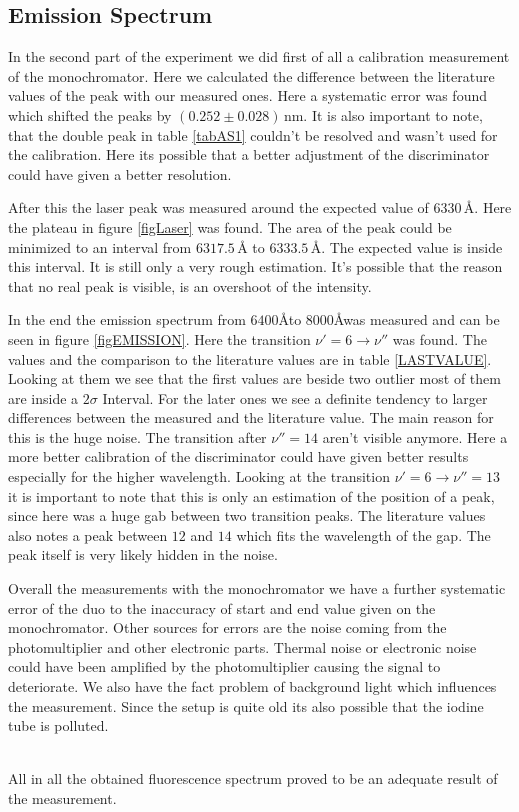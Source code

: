 \subsection{Emission Spectrum}
In the second part of the experiment we did first of all a calibration measurement of the monochromator. Here we calculated the difference between the literature values of the peak with our measured ones. Here a systematic error was found which shifted the peaks by $(0.252\pm0.028)\,$nm. It is also important to note, that the double peak in table \ref{tabAS1} couldn't be resolved and wasn't used for the calibration. Here its possible that a better adjustment of the discriminator could have given a better resolution.\par
After this the laser peak was measured around the expected value of $6330\,\text{\AA}$. Here the plateau in figure \ref{figLaser} was found. The area of the peak could be minimized to an interval from $6317.5\,\text{\AA}$ to $6333.5\,\text{\AA}$. The expected value is inside this interval. It is still only a very rough estimation. It's possible that the reason that no real peak is visible, is an overshoot of the intensity.\par
In the end the emission spectrum from $6400$\AA to $8000$\AA was measured and can be seen in figure \ref{figEMISSION}. Here the transition $\nu'=6\rightarrow \nu''$ was found. The values and the comparison to the literature values are in table \ref{LASTVALUE}. Looking at them we see that the first values are beside two outlier most of them are inside a $2\sigma$ Interval. For the later ones we see a definite tendency to larger differences between the measured and the literature value. The main reason for this is the huge noise. The transition after $\nu''=14$ aren't visible anymore. Here a more better calibration of the discriminator could have given better results especially for the higher wavelength. Looking at the transition $\nu'=6\rightarrow \nu''=13$ it is important to note that this is only an estimation of the position of a peak, since here was a huge gab between two transition peaks. The literature values also notes a peak between $12$ and $14$ which fits the wavelength of the gap. The peak itself is very likely hidden in the noise.\par
Overall the measurements with the monochromator we have a further systematic error of the duo to the inaccuracy of start and end value given on the monochromator. Other sources for errors are the noise coming from the photomultiplier and other electronic parts. Thermal noise or electronic noise could have been amplified by the photomultiplier causing the signal to deteriorate. We also have the fact problem of background light which influences the measurement. Since the setup is quite old its also possible that the iodine tube is polluted.\par
\ \\
All in all the obtained fluorescence spectrum proved to be an adequate result of the measurement.